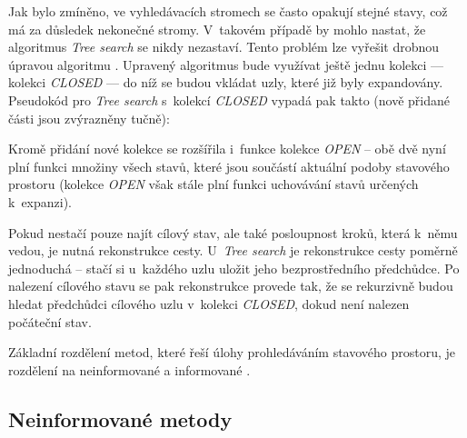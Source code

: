 Jak bylo zmíněno, ve vyhledávacích stromech se často opakují stejné stavy, což má za důsledek nekonečné stromy. V~takovém případě by mohlo nastat, že algoritmus \emph{Tree search} se nikdy nezastaví. Tento problém lze vyřešit drobnou úpravou algoritmu \cite{AI_Russel_Norvig}. Upravený algoritmus bude využívat ještě jednu kolekci --- kolekci \emph{CLOSED} --- do níž se budou vkládat uzly, které již byly expandovány. Pseudokód pro \emph{Tree search} s~kolekcí \emph{CLOSED} vypadá pak takto (nově přidané části jsou zvýrazněny tučně):
Kromě přidání nové kolekce se rozšířila i~funkce kolekce \emph{OPEN} -- obě dvě nyní plní funkci množiny všech stavů, které jsou součástí aktuální podoby stavového prostoru (kolekce \emph{OPEN} však stále plní funkci uchovávání stavů určených k~expanzi).

Pokud nestačí pouze najít cílový stav, ale také posloupnost kroků, která k~němu vedou, je nutná rekonstrukce cesty. U~\emph{Tree search} je rekonstrukce cesty poměrně jednoduchá -- stačí si u~každého uzlu uložit jeho bezprostředního předchůdce. Po nalezení cílového stavu se pak rekonstrukce provede tak, že se rekurzivně budou hledat předchůdci cílového uzlu v~kolekci \emph{CLOSED}, dokud není nalezen počáteční stav.

Základní rozdělení metod, které řeší úlohy prohledáváním stavového prostoru, je rozdělení na neinformované a informované \cite{AI_Russel_Norvig}.

\subsection*{Neinformované metody}


